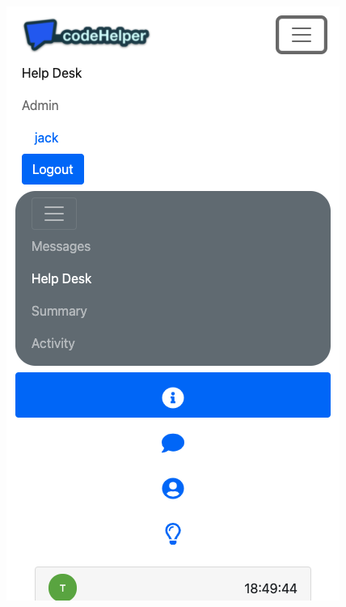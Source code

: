 \begin{figure}[H]
\begin{minipage}{.5\textwidth}
    \includegraphics[width=\textwidth]{8implementation/images/mobDemNav.png}
  \label{fig:mobDemNav}
\end{minipage}
\end{figure}

